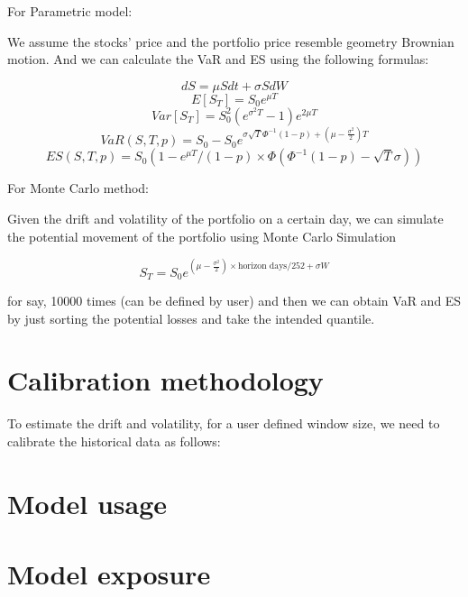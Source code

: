 \documentclass[letterpaper,11pt, oneside]{layout}
\begin{document}
For Parametric model:

We assume the stocks’ price and the portfolio price resemble geometry Brownian motion. And we can calculate the VaR and ES using the following formulas:

\begin{equation}
dS=\mu Sdt+\sigma SdW
\end{equation}
\begin{equation}
E[S_T]=S_0 e^{\mu T}
\end{equation}
\begin{equation}
Var[S_T]=S_0^2( e^{\sigma^2 T}-1)e^{2\mu T}
\end{equation}
\begin{equation}
VaR(S, T, p)=S_0-S_0 e^{\sigma\sqrt{T}\Phi^{-1}(1-p)+ (\mu-\frac{\sigma^2}{2})T}
\end{equation}
\begin{equation}
ES(S, T, p)=S_0(1-e^{\mu T}/(1-p)\times\Phi(\Phi^{-1}(1-p)-\sqrt{T}\sigma))
\end{equation}

For Monte Carlo method:

Given the drift and volatility of the portfolio on a certain day, we can simulate the potential movement of the portfolio using Monte Carlo Simulation 

\begin{equation}
S_T=S_0 e^{(\mu-\frac{\sigma^2}{2})\times \text{horizon days}/252+\sigma W}
\end{equation}

for say, 10000 times (can be defined by user) and then we can obtain VaR and ES by just sorting the potential losses and take the intended quantile.

\section{Calibration methodology}
\label{sec:md:cm}

To estimate the drift and volatility, for a user defined window size, we need to calibrate the historical data as follows:

\section{Model usage}
\label{sec:md:mu}

\section{Model exposure}
\label{sec:md:me}
\end{document}
